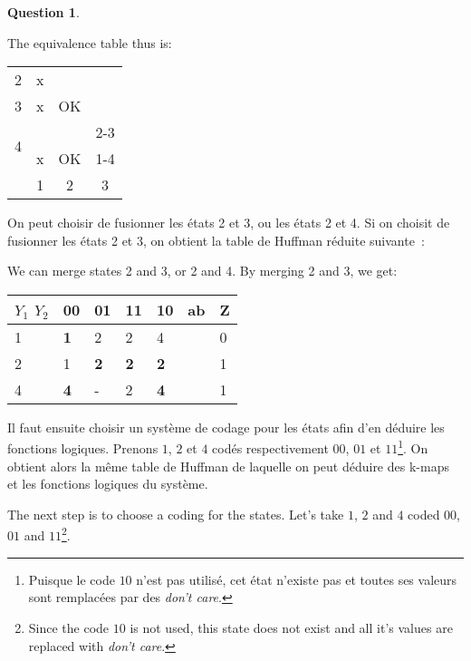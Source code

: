 \documentclass[11pt,a4paper,dvipsnames]{article}
\theoremstyle{definition}%
\newtheorem{Q}{Question}[] %
\newcommand{\fr}[1]{
 	\ifthenelse {\boolean{fr}} {#1} {}
 }
\newcommand{\en}[1]{
 	\ifthenelse {\boolean{en}} {#1} {}
 }
\begin{document}
\begin{Q}
{\begin{enumerate}
{		The equivalence table thus is:}
		\begin{center}
			\begin{tabular}{cccc} \cline{1-2}
				\multicolumn{1}{|c|}{2}	& 						\multicolumn{1}{c|}{\cellcolor{red!25}x} 					& 																	& \\ \cline{1-3}
				\multicolumn{1}{|c|}{3}	& 						\multicolumn{1}{c|}{\cellcolor{red!25}x} 					& \multicolumn{1}{c|}{\cellcolor{green!25}OK}						& \\ \cline{1-4}
				\multicolumn{1}{|c|}{\multirow{2}{*}{4}} & 		\multicolumn{1}{c|}{\cellcolor{red!25}}						& \multicolumn{1}{c|}{\cellcolor{green!25}} 						& \multicolumn{1}{c|}{\cellcolor{red!25}2-3}\\
				\multicolumn{1}{|c|}{} & 						\multicolumn{1}{c|}{\multirow{-2}{*}{\cellcolor{red!25}x}} & \multicolumn{1}{c|}{\multirow{-2}{*}{\cellcolor{green!25}OK}} 	& \multicolumn{1}{c|}{\cellcolor{red!25}1-4} \\ \cline{1-4}
			 & 													\multicolumn{1}{|c|}{1} & 									  \multicolumn{1}{c|}{2} 											& \multicolumn{1}{c|}{3} \\ \cline{2-4}
			\end{tabular}
		\end{center}

		\fr{On peut choisir de fusionner les états 2 et 3, ou les états 2 et 4.
		Si on choisit de fusionner les états 2 et 3, on obtient la table de Huffman réduite suivante~:}
		\en{We can merge states 2 and 3, or 2 and 4.
		By merging 2 and 3, we get:}
		\begin{center}
			\begin{tabular}{|l|l|l|l|l|l|l|}
			\hline
			$Y_1$ $Y_2$ & 00         & 01         & 11         & 10         & ab & Z \\ \hline
			1           & \textbf{1} & 2          & 2          & 4          &    & 0 \\ \cline{1-5} \cline{7-7}
			2           & 1          & \textbf{2} & \textbf{2} & \textbf{2} &    & 1 \\ \cline{1-5} \cline{7-7}
			4           & \textbf{4} & -          & 2          & \textbf{4} &    & 1 \\ \cline{1-5} \cline{7-7}
			\end{tabular}
		\end{center}

		\fr{Il faut ensuite choisir un système de codage pour les états afin d'en déduire les fonctions logiques.
		Prenons $1$, $2$ et $4$ codés respectivement $00$, $01$ et $11$\footnote{Puisque le code $10$ n'est pas utilisé, cet état n'existe pas et toutes ses valeurs sont remplacées par des \textit{don't care}.}.
		On obtient alors la même table de Huffman de laquelle on peut déduire des k-maps et les fonctions logiques du système.}
		\en{The next step is to choose a coding for the states.
		Let's take $1$, $2$ and $4$ coded $00$, $01$ and $11$\footnote{Since the code $10$ is not used, this state does not exist and all it's values are replaced with \textit{don't care}.}.}


\end{enumerate}}
\end{Q}
\end{document}
